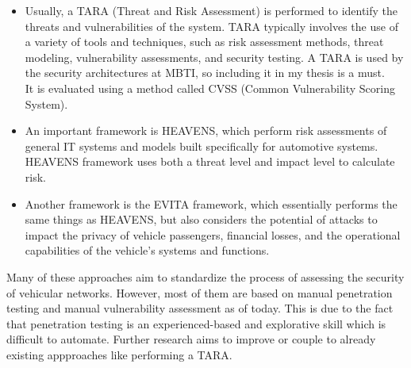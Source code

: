 \begin{itemize}

\item Usually, a TARA (Threat and Risk Assessment)\cite{tara} is performed to identify the threats and vulnerabilities of the system. 
TARA typically involves the use of a variety of tools and techniques, such as risk assessment methods, threat modeling, vulnerability assessments, and security testing. 
A TARA is used by the security architectures at MBTI, so including it in my thesis is a must.\\
It is evaluated using a method called CVSS\cite{cvss} (Common Vulnerability Scoring System).

\item An important framework is HEAVENS, which perform risk assessments of general IT systems and models built specifically for automotive systems. 
HEAVENS framework uses both a threat level and impact level to calculate risk\cite{heavens}.\\

\item Another framework is the EVITA framework, which essentially performs the same things as HEAVENS, but also considers the potential of attacks to impact the privacy of vehicle passengers, financial losses, and the operational capabilities of the vehicle's systems and functions\cite{evita}.\\

\end{itemize}

Many of these approaches aim to standardize the process of assessing the security of vehicular networks.
However, most of them are based on manual penetration testing and manual vulnerability assessment as of today.
This is due to the fact that penetration testing is an experienced-based and explorative skill which is difficult to automate.
Further research aims to improve or couple to already existing appproaches like performing a TARA.
\\

